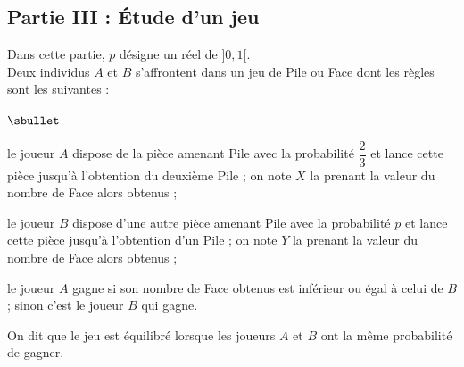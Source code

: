 \documentclass[11pt]{article}%
\begin{document}
\subsection*{Partie III : Étude d'un jeu}

\noindent
Dans cette partie, $p$ désigne un réel de $]0,1[$.\\[.1cm]
Deux individus $A$ et $B$ s'affrontent dans un jeu de Pile ou Face dont 
les règles sont les suivantes :
\begin{noliste}{$\sbullet$}
  \item le joueur $A$ dispose de la pièce amenant Pile avec la 
  probabilité $\dfrac{2}{3}$ et lance cette pièce jusqu'à l'obtention 
  du deuxième Pile ; on note $X$ la \var prenant la 
  valeur du nombre de Face alors obtenus ;
  
  \item le joueur $B$ dispose d'une autre pièce amenant Pile avec la
  probabilité $p$ et lance cette pièce jusqu'à l'obtention d'un Pile ;
  on note $Y$ la \var prenant la valeur du nombre de 
  Face alors obtenus ;
  
  \item le joueur $A$ gagne si son nombre de Face obtenus est inférieur
  ou égal à celui de $B$ ; sinon c'est le joueur $B$ qui gagne.
\end{noliste}
On dit que le jeu est équilibré lorsque les joueurs $A$ et $B$ ont la 
même probabilité de gagner.
\end{document}
